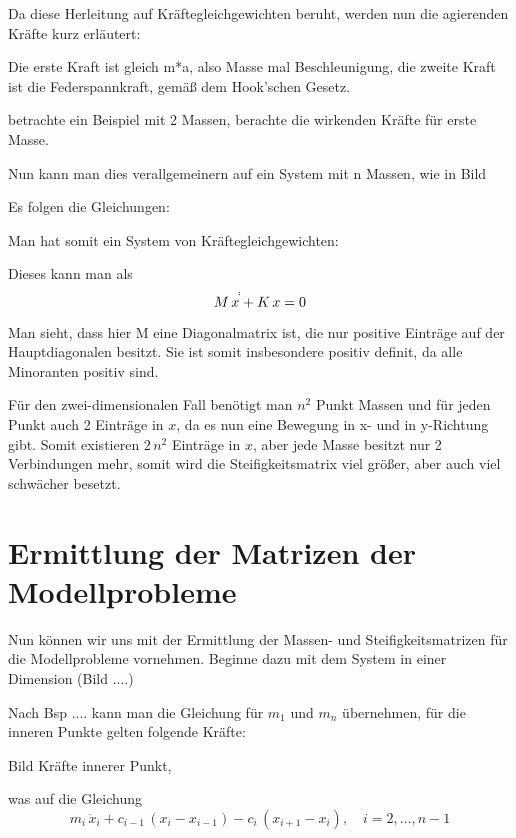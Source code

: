 \documentclass[ngerman,BCOR=4mm]{tudscrreprt}
\theoremstyle{plain} %
\theoremstyle{definition} %
\theoremstyle{remark}
\begin{document}
            Da diese Herleitung auf Kräftegleichgewichten beruht, werden nun die agierenden Kräfte kurz erläutert:

            Die erste Kraft ist gleich m*a, also Masse mal Beschleunigung, die zweite Kraft ist die Federspannkraft, gemäß dem Hook'schen Gesetz.

            betrachte ein Beispiel mit 2 Massen, berachte die wirkenden Kräfte für erste Masse.

            Nun kann man dies verallgemeinern auf ein System mit n Massen, wie in Bild

            Es folgen die Gleichungen:



            Man hat somit ein System von Kräftegleichgewichten:

            Dieses kann man als
            \begin{equation}
                  \label{eqn: MK Gleichung in 1D}
                  M\,x^{\dot\dot} + K\,x = 0
            \end{equation}

            Man sieht, dass hier M eine Diagonalmatrix ist, die nur positive Einträge auf der Hauptdiagonalen besitzt.
            Sie ist somit insbesondere positiv definit, da alle Minoranten positiv sind.

            Für den zwei-dimensionalen Fall benötigt man $n^2$ Punkt Massen und für jeden Punkt auch 2 Einträge in $x$, da es nun eine Bewegung in x- und in y-Richtung gibt.
            Somit existieren $2\,n^2$ Einträge in $x$, aber jede Masse besitzt nur 2 Verbindungen mehr, somit wird die Steifigkeitsmatrix \K viel größer, aber auch viel schwächer besetzt.
            
      \section{Ermittlung der Matrizen der Modellprobleme}
            Nun können wir uns mit der Ermittlung der Massen- und Steifigkeitsmatrizen für die Modellprobleme vornehmen.
            Beginne dazu mit dem System in einer Dimension (Bild ....)

            Nach Bsp .... kann man die Gleichung für $m_1$ und $m_n$ übernehmen, für die inneren Punkte gelten folgende Kräfte:

            Bild Kräfte innerer Punkt,

            was auf die Gleichung
            $$m_i\,\ddot x_i + c_{i-1}\,(x_i-x_{i-1}) - c_i\,(x_{i+1}-x_i), \quad i=2,...,n-1$$
\end{document}

